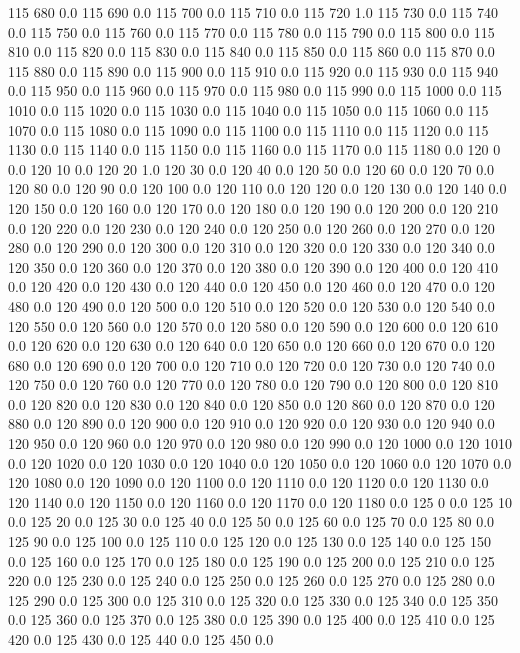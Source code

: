115	680	0.0
115	690	0.0
115	700	0.0
115	710	0.0
115	720	1.0
115	730	0.0
115	740	0.0
115	750	0.0
115	760	0.0
115	770	0.0
115	780	0.0
115	790	0.0
115	800	0.0
115	810	0.0
115	820	0.0
115	830	0.0
115	840	0.0
115	850	0.0
115	860	0.0
115	870	0.0
115	880	0.0
115	890	0.0
115	900	0.0
115	910	0.0
115	920	0.0
115	930	0.0
115	940	0.0
115	950	0.0
115	960	0.0
115	970	0.0
115	980	0.0
115	990	0.0
115	1000	0.0
115	1010	0.0
115	1020	0.0
115	1030	0.0
115	1040	0.0
115	1050	0.0
115	1060	0.0
115	1070	0.0
115	1080	0.0
115	1090	0.0
115	1100	0.0
115	1110	0.0
115	1120	0.0
115	1130	0.0
115	1140	0.0
115	1150	0.0
115	1160	0.0
115	1170	0.0
115	1180	0.0
120	0	0.0
120	10	0.0
120	20	1.0
120	30	0.0
120	40	0.0
120	50	0.0
120	60	0.0
120	70	0.0
120	80	0.0
120	90	0.0
120	100	0.0
120	110	0.0
120	120	0.0
120	130	0.0
120	140	0.0
120	150	0.0
120	160	0.0
120	170	0.0
120	180	0.0
120	190	0.0
120	200	0.0
120	210	0.0
120	220	0.0
120	230	0.0
120	240	0.0
120	250	0.0
120	260	0.0
120	270	0.0
120	280	0.0
120	290	0.0
120	300	0.0
120	310	0.0
120	320	0.0
120	330	0.0
120	340	0.0
120	350	0.0
120	360	0.0
120	370	0.0
120	380	0.0
120	390	0.0
120	400	0.0
120	410	0.0
120	420	0.0
120	430	0.0
120	440	0.0
120	450	0.0
120	460	0.0
120	470	0.0
120	480	0.0
120	490	0.0
120	500	0.0
120	510	0.0
120	520	0.0
120	530	0.0
120	540	0.0
120	550	0.0
120	560	0.0
120	570	0.0
120	580	0.0
120	590	0.0
120	600	0.0
120	610	0.0
120	620	0.0
120	630	0.0
120	640	0.0
120	650	0.0
120	660	0.0
120	670	0.0
120	680	0.0
120	690	0.0
120	700	0.0
120	710	0.0
120	720	0.0
120	730	0.0
120	740	0.0
120	750	0.0
120	760	0.0
120	770	0.0
120	780	0.0
120	790	0.0
120	800	0.0
120	810	0.0
120	820	0.0
120	830	0.0
120	840	0.0
120	850	0.0
120	860	0.0
120	870	0.0
120	880	0.0
120	890	0.0
120	900	0.0
120	910	0.0
120	920	0.0
120	930	0.0
120	940	0.0
120	950	0.0
120	960	0.0
120	970	0.0
120	980	0.0
120	990	0.0
120	1000	0.0
120	1010	0.0
120	1020	0.0
120	1030	0.0
120	1040	0.0
120	1050	0.0
120	1060	0.0
120	1070	0.0
120	1080	0.0
120	1090	0.0
120	1100	0.0
120	1110	0.0
120	1120	0.0
120	1130	0.0
120	1140	0.0
120	1150	0.0
120	1160	0.0
120	1170	0.0
120	1180	0.0
125	0	0.0
125	10	0.0
125	20	0.0
125	30	0.0
125	40	0.0
125	50	0.0
125	60	0.0
125	70	0.0
125	80	0.0
125	90	0.0
125	100	0.0
125	110	0.0
125	120	0.0
125	130	0.0
125	140	0.0
125	150	0.0
125	160	0.0
125	170	0.0
125	180	0.0
125	190	0.0
125	200	0.0
125	210	0.0
125	220	0.0
125	230	0.0
125	240	0.0
125	250	0.0
125	260	0.0
125	270	0.0
125	280	0.0
125	290	0.0
125	300	0.0
125	310	0.0
125	320	0.0
125	330	0.0
125	340	0.0
125	350	0.0
125	360	0.0
125	370	0.0
125	380	0.0
125	390	0.0
125	400	0.0
125	410	0.0
125	420	0.0
125	430	0.0
125	440	0.0
125	450	0.0
